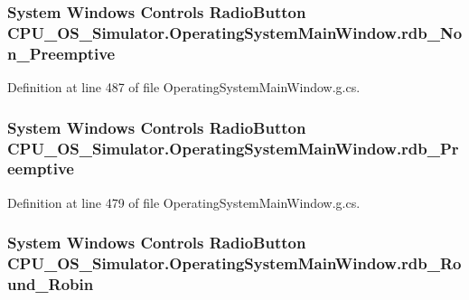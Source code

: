 \subsubsection[{rdb\+\_\+\+Non\+\_\+\+Preemptive}]{\setlength{\rightskip}{0pt plus 5cm}System Windows Controls Radio\+Button C\+P\+U\+\_\+\+O\+S\+\_\+\+Simulator.\+Operating\+System\+Main\+Window.\+rdb\+\_\+\+Non\+\_\+\+Preemptive\hspace{0.3cm}{\ttfamily [package]}}\label{class_c_p_u___o_s___simulator_1_1_operating_system_main_window_a3021441de903045cba2ff708184e0ac5}


Definition at line 487 of file Operating\+System\+Main\+Window.\+g.\+cs.

\hypertarget{class_c_p_u___o_s___simulator_1_1_operating_system_main_window_a1bdd1425ce8e8dba8ea5906e787aa9b1}{}
\subsubsection[{rdb\+\_\+\+Preemptive}]{\setlength{\rightskip}{0pt plus 5cm}System Windows Controls Radio\+Button C\+P\+U\+\_\+\+O\+S\+\_\+\+Simulator.\+Operating\+System\+Main\+Window.\+rdb\+\_\+\+Preemptive\hspace{0.3cm}{\ttfamily [package]}}\label{class_c_p_u___o_s___simulator_1_1_operating_system_main_window_a1bdd1425ce8e8dba8ea5906e787aa9b1}


Definition at line 479 of file Operating\+System\+Main\+Window.\+g.\+cs.

\hypertarget{class_c_p_u___o_s___simulator_1_1_operating_system_main_window_a5be51435049a03c98c57e035eff181ec}{}
\subsubsection[{rdb\+\_\+\+Round\+\_\+\+Robin}]{\setlength{\rightskip}{0pt plus 5cm}System Windows Controls Radio\+Button C\+P\+U\+\_\+\+O\+S\+\_\+\+Simulator.\+Operating\+System\+Main\+Window.\+rdb\+\_\+\+Round\+\_\+\+Robin\hspace{0.3cm}{\ttfamily [package]}}\label{class_c_p_u___o_s___simulator_1_1_operating_system_main_window_a5be51435049a03c98c57e035eff181ec}


